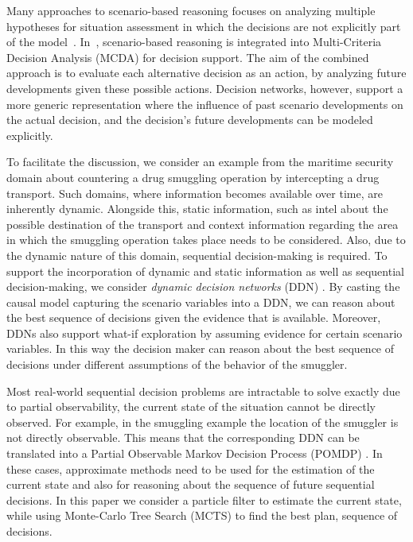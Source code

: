 \documentclass[conference]{IEEEtran}
\begin{document}
Many approaches to scenario-based reasoning focuses on analyzing multiple hypotheses for situation assessment in which the decisions are not explicitly part of the model~\cite{roy07fus,gustavi11eisic,holsopple}. In~\cite{comes09iscram}, scenario-based reasoning is integrated into Multi-Criteria Decision Analysis (MCDA) for decision support. The aim of the combined approach is to evaluate each alternative decision as an action, by analyzing future developments given these possible actions. Decision networks, however, support a more generic representation where the influence of past scenario developments on the actual decision, and the decision's future developments can be modeled explicitly.


To facilitate the discussion, we consider an example from the maritime security domain about countering a drug smuggling operation by intercepting a drug transport. Such domains, where information becomes available over time, are inherently dynamic. Alongside this, static information, such as intel about the possible destination of the transport and context information regarding the area in which the smuggling operation takes place needs to be considered. Also, due to the dynamic nature of this domain, sequential decision-making is required. To support the incorporation of dynamic and static information as well as sequential decision-making, we consider {\em dynamic decision networks} (DDN) \cite{russell02bn, jensen07book}. By casting the causal model capturing the scenario variables into a DDN, we can reason about the best sequence of decisions given the evidence that is available. Moreover, DDNs also support what-if exploration by assuming evidence for certain scenario variables. In this way the decision maker can reason about the best sequence of decisions under different assumptions of the behavior of the smuggler.

Most real-world sequential decision problems are intractable to solve exactly due to partial observability, \ie the current state of the situation cannot be directly observed. For example, in the smuggling example the location of the smuggler is not directly observable. This means that the corresponding DDN can be translated into a Partial Observable Markov Decision Process (POMDP) \cite{pomdp}. In these cases, approximate methods need to be used for the estimation of the current state and also for reasoning about the sequence of future sequential decisions. In this paper we consider a particle filter to estimate the current state, while using Monte-Carlo Tree Search (MCTS) \cite{browne2012survey} to find the best plan, \ie sequence of decisions.
\end{document}
